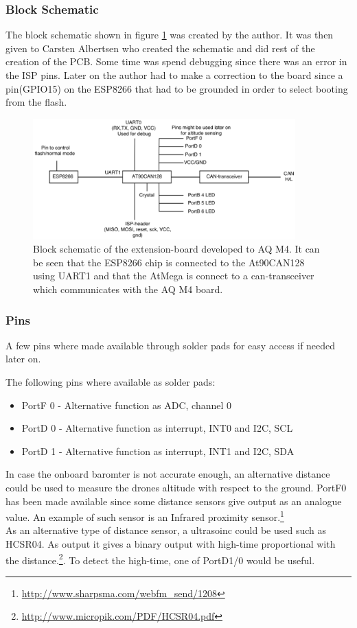 \subsubsection*{Block Schematic}
The block schematic shown in figure \ref{fig:PCB_block} was created by the author. It was then given to Carsten Albertsen who created the schematic and did rest of the creation of the PCB. Some time was spend  debugging since there was an error in the ISP pins. Later on the author had to make a correction to the board since a pin(GPIO15) on the ESP8266 that had to be grounded in order to select booting from the flash.
\begin{figure}[H]
    \center
    \includegraphics[width=0.9\textwidth]{graphics/PCB_block_v3.eps}
    \caption{Block schematic of the extension-board developed to AQ M4. It can be seen that the ESP8266 chip is connected to the At90CAN128 using UART1 and that the AtMega is connect to a can-transceiver which  communicates with the AQ M4 board.}
    \label{fig:PCB_block}
\end{figure}

\subsubsection*{Pins}
A few pins where made available through solder pads for easy access if needed later on.

The following pins where available as solder pads:
\begin{itemize}
	\item PortF 0 - Alternative function as ADC, channel 0
	\item PortD 0 - Alternative function as interrupt, INT0 and I2C, SCL
	\item PortD 1 - Alternative function as interrupt, INT1 and I2C, SDA
\end{itemize}
In case the onboard baromter is not accurate enough, an alternative distance could be used to measure the drones altitude with respect to the ground.
PortF0 has been made available since some distance sensors give output as an analogue value. 
An example of such sensor is an Infrared proximity sensor.\footnote{\url{http://www.sharpsma.com/webfm\_send/1208}} \\
As an alternative type of distance sensor, a ultrasoinc could be used such as HCSR04.
As output it gives a binary output with high-time proportional with the distance.\footnote{\url{http://www.micropik.com/PDF/HCSR04.pdf}}.
To detect the high-time, one of PortD1/0 would be useful. \\

